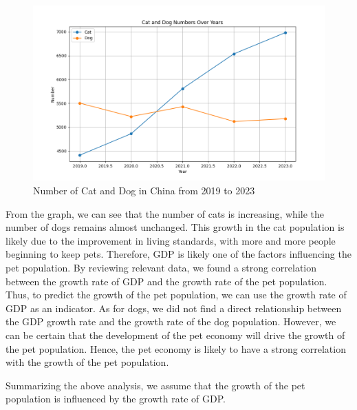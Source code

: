 \documentclass[withoutpreface,bwprint]{cumcmthesis} %
\begin{document}
\begin{figure}[htbp]
	\centering
	\includegraphics[scale=0.6]{Figure_2}
	\caption{Number of Cat and Dog in China from 2019 to 2023}
\end{figure}
\par From the graph, we can see that the number of cats is increasing, while the number of dogs remains almost unchanged. This growth in the cat population is likely due to the improvement in living standards, with more and more people beginning to keep pets.
Therefore, GDP is likely one of the factors influencing the pet population. By reviewing relevant data, we found a strong correlation between the growth rate of GDP and the growth rate of the pet population.
Thus, to predict the growth of the pet population, we can use the growth rate of GDP as an indicator.
As for dogs, we did not find a direct relationship between the GDP growth rate and the growth rate of the dog population. However, we can be certain that the development of the pet economy will drive the growth of the pet population.
Hence, the pet economy is likely to have a strong correlation with the growth of the pet population.
\par Summarizing the above analysis, we assume that the growth of the pet population is influenced by the growth rate of GDP.
\end{document}
